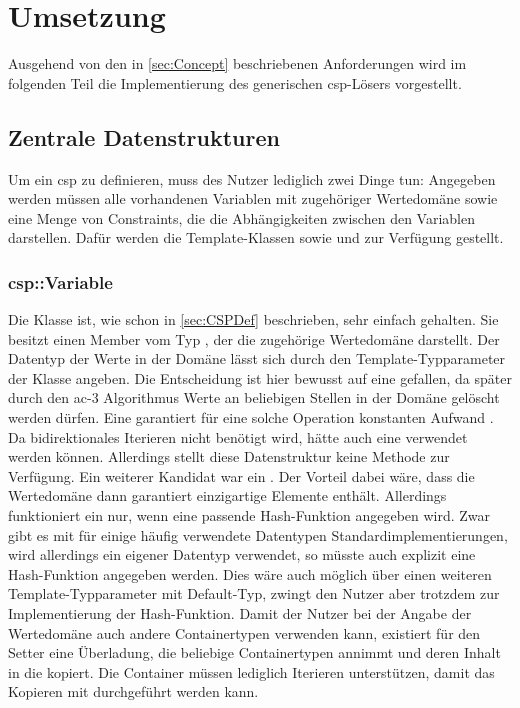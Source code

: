 \section{Umsetzung}
Ausgehend von den in \cref{sec:Concept} beschriebenen Anforderungen wird im folgenden Teil die Implementierung des generischen \ac*{csp}-Lösers vorgestellt.

\subsection{Zentrale Datenstrukturen}
Um ein \ac*{csp} zu definieren, muss des Nutzer lediglich zwei Dinge tun: Angegeben werden müssen alle vorhandenen Variablen mit zugehöriger Wertedomäne sowie eine Menge von
Constraints, die die Abhängigkeiten zwischen den Variablen darstellen. Dafür werden die Template-Klassen  sowie  und
 zur Verfügung gestellt.

\subsubsection{csp::Variable}
Die Klasse  ist, wie schon in \cref{sec:CSPDef} beschrieben, sehr einfach gehalten. Sie besitzt einen Member vom Typ , der die zugehörige
Wertedomäne darstellt. Der Datentyp der Werte in der Domäne lässt sich durch den Template-Typparameter der Klasse angeben. Die Entscheidung ist hier bewusst auf eine
 gefallen, da später durch den \ac*{ac}-3 Algorithmus Werte an beliebigen Stellen in der Domäne gelöscht werden dürfen. Eine  garantiert für
eine solche Operation konstanten Aufwand \cite{stdList}. Da bidirektionales Iterieren nicht benötigt wird, hätte auch eine  verwendet werden können.
Allerdings stellt diese Datenstruktur keine Methode  zur Verfügung. Ein weiterer Kandidat war ein . Der Vorteil dabei wäre, dass die
Wertedomäne dann garantiert einzigartige Elemente enthält. Allerdings funktioniert ein  nur, wenn eine passende Hash-Funktion angegeben wird. Zwar gibt
es mit  für einige häufig verwendete Datentypen Standardimplementierungen, wird allerdings ein eigener Datentyp verwendet, so müsste auch explizit eine
Hash-Funktion angegeben werden. Dies wäre auch möglich über einen weiteren Template-Typparameter mit Default-Typ, zwingt den Nutzer aber trotzdem zur Implementierung der
Hash-Funktion. Damit der Nutzer bei der Angabe der Wertedomäne auch andere Containertypen verwenden kann, existiert für den Setter  eine Überladung, die
beliebige Containertypen annimmt und deren Inhalt in die  kopiert. Die Container müssen lediglich Iterieren unterstützen, damit das Kopieren mit
 durchgeführt werden kann.

